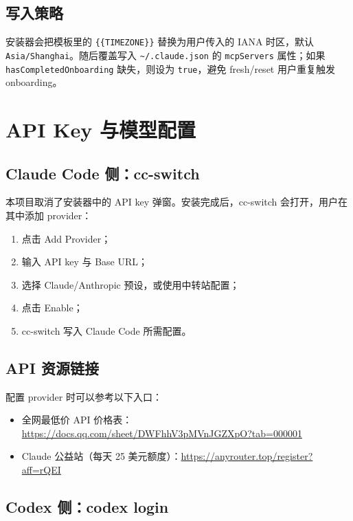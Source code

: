 \documentclass[11pt,a4paper]{ctexbook}
\begin{document}
\section{写入策略}

安装器会把模板里的 \texttt{\{\{TIMEZONE\}\}} 替换为用户传入的 IANA 时区，默认 \texttt{Asia/Shanghai}。随后覆盖写入 \texttt{\textasciitilde/.claude.json} 的 \texttt{mcpServers} 属性；如果 \texttt{hasCompletedOnboarding} 缺失，则设为 \texttt{true}，避免 fresh/reset 用户重复触发 onboarding。

\chapter{API Key 与模型配置}

\section{Claude Code 侧：cc-switch}

本项目取消了安装器中的 API key 弹窗。安装完成后，cc-switch 会打开，用户在其中添加 provider：

\begin{enumerate}[leftmargin=2em]
  \item 点击 Add Provider；
  \item 输入 API key 与 Base URL；
  \item 选择 Claude/Anthropic 预设，或使用中转站配置；
  \item 点击 Enable；
  \item cc-switch 写入 Claude Code 所需配置。
\end{enumerate}

\section{API 资源链接}

配置 provider 时可以参考以下入口：

\begin{itemize}[leftmargin=2em]
  \item 全网最低价 API 价格表：\url{https://docs.qq.com/sheet/DWFhhV3pMVnJGZXpO?tab=000001}
  \item Claude 公益站（每天 25 美元额度）：\url{https://anyrouter.top/register?aff=rQEI}
\end{itemize}

\section{Codex 侧：codex login}
\end{document}

